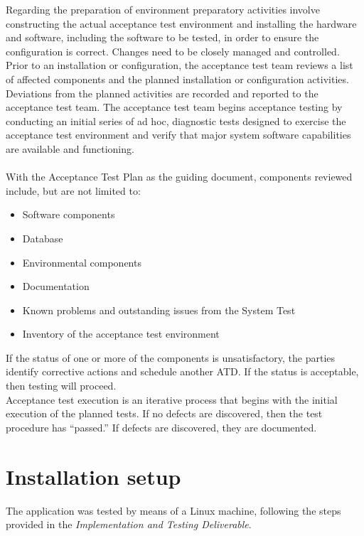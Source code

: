\documentclass[a4paper, hidelinks, 12pt]{report}
\begin{document}
Regarding the preparation of environment preparatory activities involve constructing the actual acceptance test environment and installing the hardware and software, including the software to be tested, in order to ensure the configuration is correct.  Changes need to be closely managed and controlled. Prior to an installation or configuration, the acceptance test team reviews a list of affected components and the planned installation or configuration activities.  Deviations from the planned activities are recorded and reported to the acceptance test team.  The acceptance test team begins acceptance testing by conducting an initial series of ad hoc, diagnostic tests designed to exercise the acceptance test environment and verify that major system software capabilities are available and functioning.\\\\
With the Acceptance Test Plan as the guiding document, components reviewed include, but are not limited to:
\begin{itemize}
\item{}Software components
\item{}Database
\item{}Environmental components
\item{}Documentation
\item{}Known problems and outstanding issues from the System Test
\item{}Inventory of the acceptance test environment

\end{itemize}
If the status of one or more of the components is unsatisfactory, the parties identify corrective actions and schedule another ATD.  If the status is acceptable, then testing will proceed.\\
Acceptance test execution is an iterative process that begins with the initial execution of the planned tests.  If no defects are discovered, then the test procedure has “passed.” If defects are discovered, they are documented.

	\chapter{Installation setup}

	The application was tested by means of a Linux machine, following the steps provided in the \textit{Implementation and Testing Deliverable}. 
	
\end{document}
